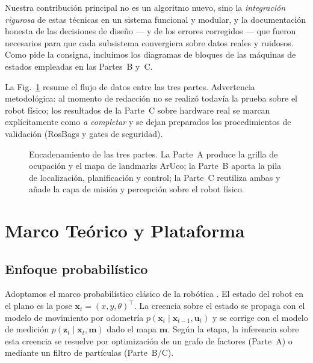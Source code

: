 \documentclass[conference]{IEEEtran}
\begin{document}
Nuestra contribución principal no es un algoritmo nuevo, sino la \emph{integración rigurosa} de estas técnicas en un sistema funcional y modular, y la documentación honesta de las decisiones de diseño --- y de los errores corregidos --- que fueron necesarios para que cada subsistema convergiera sobre datos reales y ruidosos. Como pide la consigna, incluimos los diagramas de bloques de las máquinas de estados empleadas en las Partes~B y~C.

La Fig.~\ref{fig:pipeline} resume el flujo de datos entre las tres partes. Advertencia metodológica: al momento de redacción no se realizó todavía la prueba sobre el robot físico; los resultados de la Parte~C sobre hardware real se marcan explícitamente como \emph{a completar} y se dejan preparados los procedimientos de validación (RosBags y gates de seguridad).

\begin{figure}[t]
\centering
{}
\caption{Encadenamiento de las tres partes. La Parte~A produce la grilla de ocupación y el mapa de landmarks ArUco; la Parte~B aporta la pila de localización, planificación y control; la Parte~C reutiliza ambas y añade la capa de misión y percepción sobre el robot físico.}
\label{fig:pipeline}
\end{figure}

\section{Marco Teórico y Plataforma}

\subsection{Enfoque probabilístico}
Adoptamos el marco probabilístico clásico de la robótica \cite{thrun}. El estado del robot en el plano es la pose $\mathbf{x}_t=(x,y,\theta)^\top$. La creencia sobre el estado se propaga con el modelo de movimiento por odometría $p(\mathbf{x}_t\mid\mathbf{x}_{t-1},\mathbf{u}_t)$ y se corrige con el modelo de medición $p(\mathbf{z}_t\mid\mathbf{x}_t,\mathbf{m})$ dado el mapa $\mathbf{m}$. Según la etapa, la inferencia sobre esta creencia se resuelve por optimización de un grafo de factores (Parte~A) o mediante un filtro de partículas (Parte~B/C).
\end{document}
